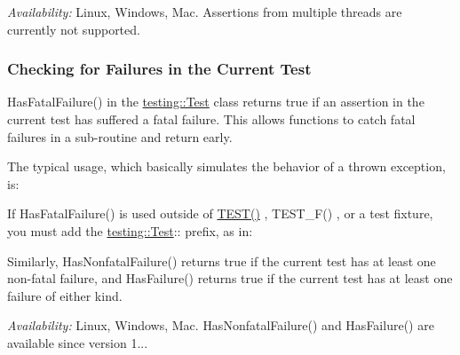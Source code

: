 {\itshape Availability\+:} Linux, Windows, Mac. Assertions from multiple threads are currently not supported.

\subsubsection*{Checking for Failures in the Current Test}

{\ttfamily Has\+Fatal\+Failure()} in the {\ttfamily \mbox{\hyperlink{classtesting_1_1_test}{testing\+::\+Test}}} class returns {\ttfamily true} if an assertion in the current test has suffered a fatal failure. This allows functions to catch fatal failures in a sub-\/routine and return early.


\begin{DoxyCode}{0}
\DoxyCodeLine{\};}
\end{DoxyCode}


The typical usage, which basically simulates the behavior of a thrown exception, is\+:


\begin{DoxyCode}{0}
\DoxyCodeLine{\}}
\end{DoxyCode}


If {\ttfamily Has\+Fatal\+Failure()} is used outside of {\ttfamily \mbox{\hyperlink{_astar_test_8cpp_a20439c3a775a4c7b88ddba250cd8f9e4}{T\+E\+S\+T()}}} , {\ttfamily T\+E\+S\+T\+\_\+\+F()} , or a test fixture, you must add the {\ttfamily \mbox{\hyperlink{classtesting_1_1_test}{testing\+::\+Test}}\+:\+:} prefix, as in\+:


\begin{DoxyCode}{0}
\end{DoxyCode}


Similarly, {\ttfamily Has\+Nonfatal\+Failure()} returns {\ttfamily true} if the current test has at least one non-\/fatal failure, and {\ttfamily Has\+Failure()} returns {\ttfamily true} if the current test has at least one failure of either kind.

{\itshape Availability\+:} Linux, Windows, Mac. {\ttfamily Has\+Nonfatal\+Failure()} and {\ttfamily Has\+Failure()} are available since version 1...

